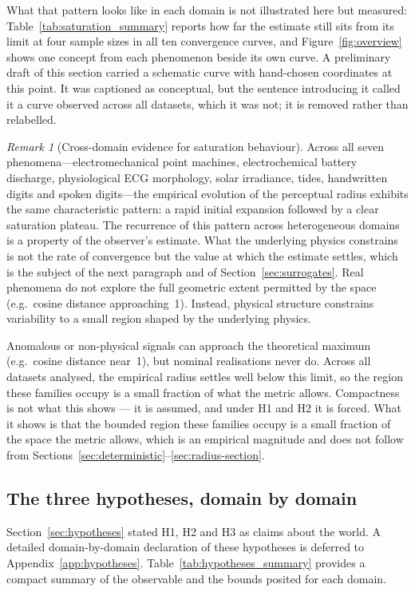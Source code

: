 \documentclass[10pt]{article}
\theoremstyle{plain}
\theoremstyle{definition}
\theoremstyle{remark}
\newtheorem{remark}[theorem]{Remark}
\begin{document}
What that pattern looks like in each domain is not illustrated here but
measured: Table~\ref{tab:saturation_summary} reports how far the estimate still
sits from its limit at four sample sizes in all ten convergence curves, and
Figure~\ref{fig:overview} shows one concept from each phenomenon beside its own
curve. A preliminary draft of this section carried a schematic curve with
hand-chosen coordinates at this point. It was captioned as conceptual, but the
sentence introducing it called it a curve observed across all datasets, which it
was not; it is removed rather than relabelled.


\begin{remark}[Cross-domain evidence for saturation behaviour]
Across all seven phenomena---electromechanical point machines, electrochemical
battery discharge, physiological ECG morphology, solar irradiance, tides,
handwritten digits and spoken digits---the empirical evolution of 
the perceptual radius exhibits the same characteristic pattern: a rapid initial 
expansion followed by a clear saturation plateau. The recurrence of this pattern across heterogeneous domains is a property of
the observer's estimate. What the underlying physics constrains is not the rate of convergence
but the value at which the estimate settles, which is the subject of the next
paragraph and of Section~\ref{sec:surrogates}.
Real phenomena do not explore the full geometric extent 
permitted by the space (e.g.\ cosine distance approaching~1). Instead, 
physical structure constrains variability to a small region shaped by the 
underlying physics.

Anomalous or non-physical signals can approach the theoretical maximum 
(e.g.\ cosine distance near~1), but nominal realisations never do. Across all 
datasets analysed, the empirical radius settles well below this limit, so the
region these families occupy is a small fraction of what the metric allows. Compactness is not what this shows --- it is assumed, and under H1 and H2 it is
forced. What it shows is that the bounded region these families occupy is a
small fraction of the space the metric allows, which is an empirical magnitude
and does not follow from Sections~\ref{sec:deterministic}--\ref{sec:radius-section}.
\end{remark}

\subsection{The three hypotheses, domain by domain}
\label{sec:hypotheses-per-domain}
Section~\ref{sec:hypotheses} stated H1, H2 and H3 as claims about the world. A detailed domain-by-domain declaration of these hypotheses is deferred to Appendix~\ref{app:hypotheses}. Table~\ref{tab:hypotheses_summary} provides a compact summary of the observable and the bounds posited for each domain.
\end{document}
